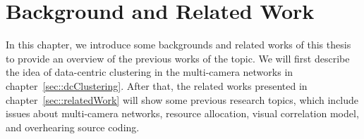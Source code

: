 \section{Background and Related Work}
\label{sec::backgroundAndRelatedWork}
In this chapter, we introduce some backgrounds and related works of this thesis to provide an overview of the previous works of the topic.
We will first describe the idea of data-centric clustering in the multi-camera networks in chapter~\ref{sec::dcClustering}.
After that, the related works presented in chapter~\ref{sec::relatedWork} will show some previous research topics, which include issues about multi-camera networks, resource allocation, visual correlation model, and overhearing source coding.

